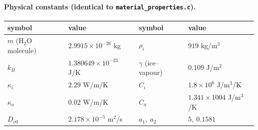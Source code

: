 \paragraph{Physical constants (identical to \texttt{material\_properties.c}).}
\begin{center}\small
\begin{tabular}{llll}
\hline
symbol & value & symbol & value \\
\hline
$m$ (H$_2$O molecule) & $2.9915\times10^{-26}$ kg &
$\rho_i$              & $919$ kg/m$^3$ \\
$k_B$                 & $1.380649\times10^{-23}$ J/K &
$\gamma$ (ice--vapour)& $0.109$ J/m$^2$ \\
$\kappa_i$            & $2.29$ W/m/K &
$C_i$                 & $1.8\times10^{6}$ J/m$^3$/K \\
$\kappa_a$            & $0.02$ W/m/K &
$C_a$                 & $1.341\times1004$ J/m$^3$/K \\
$D_{v0}$              & $2.178\times10^{-5}$ m$^2$/s &
$a_1,\ a_2$           & $5,\ 0.1581$ \\
\hline
\end{tabular}
\end{center}
